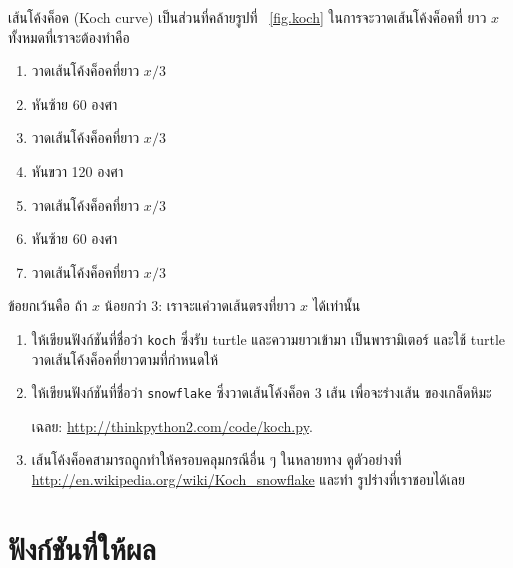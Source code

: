 \begin{exercise}

เส้นโค้งค็อค (Koch curve) เป็นส่วนที่คล้ายรูปที่ ~\ref{fig.koch} ในการจะวาดเส้นโค้งค็อคที่
ยาว $x$ ทั้งหมดที่เราจะต้องทำคือ

\begin{enumerate}

\item วาดเส้นโค้งค็อคที่ยาว $x/3$

\item หันซ้าย 60 องศา

\item วาดเส้นโค้งค็อคที่ยาว $x/3$

\item หันขวา 120 องศา

\item วาดเส้นโค้งค็อคที่ยาว $x/3$

\item หันซ้าย 60 องศา

\item วาดเส้นโค้งค็อคที่ยาว $x/3$

\end{enumerate}

ข้อยกเว้นคือ ถ้า $x$ น้อยกว่า 3: เราจะแค่วาดเส้นตรงที่ยาว $x$ ได้เท่านั้น

\begin{enumerate}

\item ให้เขียนฟังก์ชันที่ชื่อว่า {\tt koch} ซึ่งรับ turtle และความยาวเข้ามา
เป็นพารามิเตอร์ และใช้ turtle วาดเส้นโค้งค็อคที่ยาวตามที่กำหนดให้

\item ให้เขียนฟังก์ชันที่ชื่อว่า {\tt snowflake} ซึ่งวาดเส้นโค้งค็อค 3 เส้น เพื่อจะร่างเส้น
ของเกล็ดหิมะ

เฉลย: \url{http://thinkpython2.com/code/koch.py}.

\item เส้นโค้งค็อคสามารถถูกทำให้ครอบคลุมกรณีอื่น ๆ ในหลายทาง ดูตัวอย่างที่
 \url{http://en.wikipedia.org/wiki/Koch_snowflake} และทำ
 รูปร่างที่เราชอบได้เลย 

\end{enumerate}
\end{exercise}



\chapter{ฟังก์ชันที่ให้ผล} %
\label{fruitchap}

